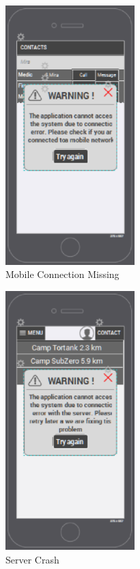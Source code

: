 \begin{figure}[htbp]
\begin{center}
 \caption{\label{fig:E3} Mobile Connection Missing}
   \includegraphics[width=50mm]{./images/Errors/mobilenetwork.eps}
\end{center}
\end{figure}

\begin{figure}[htbp]
\begin{center}
 \caption{\label{fig:E4} Server Crash}
   \includegraphics[width=50mm]{./images/Errors/servercrash.eps}
\end{center}
\end{figure}
